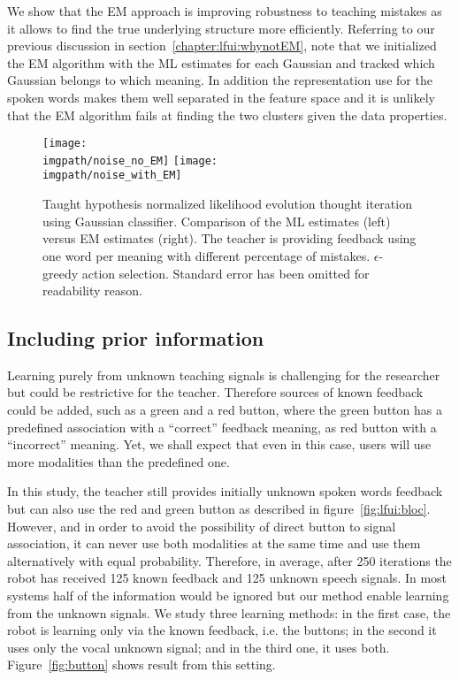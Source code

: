 We show that the EM approach is improving robustness to teaching mistakes as it allows to find the true underlying structure more efficiently. Referring to our previous discussion in section~\ref{chapter:lfui:whynotEM}, note that we initialized the EM algorithm with the ML estimates for each Gaussian and tracked which Gaussian belongs to which meaning. In addition the representation use for the spoken words makes them well separated in the feature space and it is unlikely that the EM algorithm fails at finding the two clusters given the data properties.

\begin{figure}[!ht]
  \centering
  \texttt{[image: \\imgpath/noise\_no\_EM]}
  \texttt{[image: \\imgpath/noise\_with\_EM]}
  \caption{Taught hypothesis normalized likelihood evolution thought iteration using Gaussian classifier. Comparison of the ML estimates (left) versus EM estimates (right). The teacher is providing feedback using one word per meaning with different percentage of mistakes. $\epsilon$-greedy action selection. Standard error has been omitted for readability reason.}
  \label{fig:Noise}
\end{figure}

\subsection{Including prior information}
\label{sec:IncludingPriorInformation}

Learning purely from unknown teaching signals is challenging for the researcher but could be restrictive for the teacher. Therefore sources of known feedback could be added, such as a green and a red button, where the green button has a predefined association with a ``correct'' feedback meaning, as red button with a ``incorrect'' meaning. Yet, we shall expect that even in this case, users will use more modalities than the predefined one.  

In this study, the teacher still provides initially unknown spoken words feedback but can also use the red and green button as described in figure~\ref{fig:lfui:bloc}. However, and in order to avoid the possibility of direct button to signal association, it can never use both modalities at the same time and use them alternatively with equal probability. Therefore, in average, after 250 iterations the robot has received 125 known feedback and 125 unknown speech signals. In most systems half of the information would be ignored but our method enable learning from the unknown signals. We study three learning methods: in the first case, the robot is learning only via the known feedback, i.e. the buttons; in the second it uses only the vocal unknown signal; and in the third one, it uses both. Figure~\ref{fig:button} shows result from this setting. 

